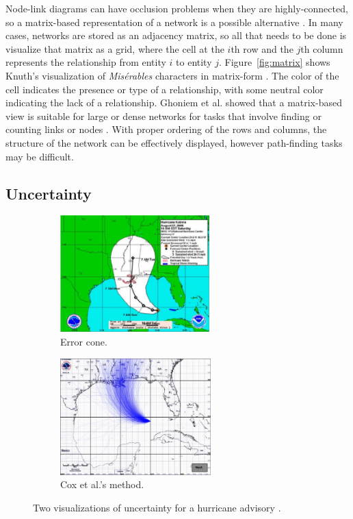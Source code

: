 Node-link diagrams can have occlusion problems when they are highly-connected, so a matrix-based representation of a network is a possible alternative \cite{heer2010}.  In many cases, networks are stored as an adjacency matrix, so all that needs to be done is visualize that matrix as a grid, where the cell at the $i$th row and the $j$th column represents the relationship from entity $i$ to entity $j$.  Figure~\ref{fig:matrix} shows Knuth's visualization of \textit{Mis\'erables} characters in matrix-form \cite{knuth1993}.  The color of the cell indicates the presence or type of a relationship, with some neutral color indicating the lack of a relationship.  Ghoniem et al. showed that a matrix-based view is suitable for large or dense networks for tasks that involve finding or counting links or nodes \cite{ghoniem2004}.  With proper ordering of the rows and columns, the structure of the network can be effectively displayed, however path-finding tasks may be difficult.

\subsection{Uncertainty}

\begin{figure}
\centering
	\begin{subfigure}[b]{0.45\textwidth}
		\centering
		\includegraphics[height=4.5cm]{figures/eps/uncertainty_cone.eps}
		\caption{Error cone.}
		\label{fig:uncertaintyCone}
	\end{subfigure}	
	\begin{subfigure}[b]{0.45\textwidth}
		\centering
		\includegraphics[height=4.5cm]{figures/eps/uncertainty_house.eps}
		\caption{Cox et al.'s method.}
		\label{fig:uncertaintyHouse}
	\end{subfigure}
	\caption{Two visualizations of uncertainty for a hurricane advisory \cite{cox2013}.}
	\label{fig:uncertaintyAlternatives}
\end{figure}


